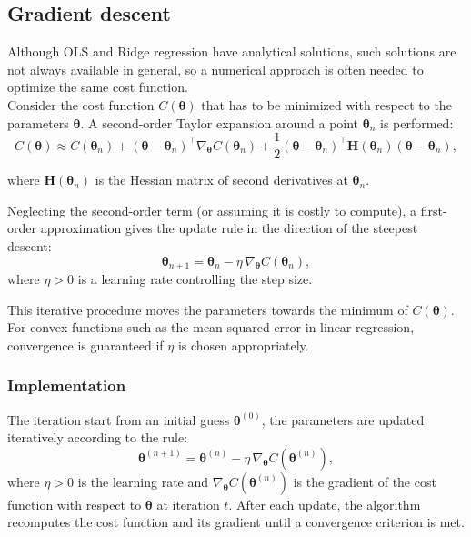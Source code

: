 \documentclass[
    article
 reprint,            %
 amsmath,amssymb,
 aps,
]{revtex4-2}
\begin{document}
\subsection{Gradient descent}

Although OLS and Ridge regression have analytical solutions, such solutions are not always available in general, so a numerical approach is often needed to optimize the same cost function.\\

Consider the cost function $C(\boldsymbol{\theta})$ that has to be minimized with respect to the parameters $\boldsymbol{\theta}$\cite{hjorthjensen_week36}.  
A second-order Taylor expansion around a point $\boldsymbol{\theta}_n$ is performed:
$$
C(\boldsymbol{\theta}) \approx C(\boldsymbol{\theta}_n) + (\boldsymbol{\theta}-\boldsymbol{\theta}_n)^\top \nabla_{\boldsymbol{\theta}} C(\boldsymbol{\theta}_n) 
+ \frac{1}{2} (\boldsymbol{\theta}-\boldsymbol{\theta}_n)^\top \mathbf{H}(\boldsymbol{\theta}_n) (\boldsymbol{\theta}-\boldsymbol{\theta}_n),
$$

where $\mathbf{H}(\boldsymbol{\theta}_n)$ is the Hessian matrix of second derivatives at $\boldsymbol{\theta}_n$.

Neglecting the second-order term (or assuming it is costly to compute), a first-order approximation gives the update rule in the direction of the steepest descent:
\[
\boldsymbol{\theta}_{n+1} = \boldsymbol{\theta}_n - \eta \, \nabla_{\boldsymbol{\theta}} C(\boldsymbol{\theta}_n),
\]
where $\eta > 0$ is a learning rate controlling the step size.  

This iterative procedure moves the parameters towards the minimum of $C(\boldsymbol{\theta})$. For convex functions such as the mean squared error in linear regression, convergence is guaranteed if $\eta$ is chosen appropriately.

\subsubsection{Implementation}
The iteration start from an initial guess $\boldsymbol{\theta}^{(0)}$, the parameters are updated iteratively according to the rule:
\[
\boldsymbol{\theta}^{(n+1)} = \boldsymbol{\theta}^{(n)} - \eta \, \nabla_{\boldsymbol{\theta}} C(\boldsymbol{\theta}^{(n)}),
\]
where $\eta > 0$ is the learning rate and $\nabla_{\boldsymbol{\theta}} C(\boldsymbol{\theta}^{(n)})$ is the gradient of the cost function with respect to $\boldsymbol{\theta}$ at iteration $t$.
After each update, the algorithm recomputes the cost function and its gradient until a convergence criterion is met.\\
\end{document}
